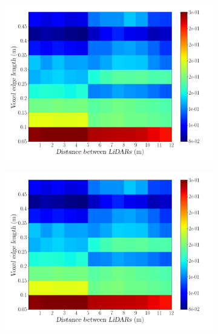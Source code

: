 \begin{figure}[!ht]
\centering
\begin{subfigure}[c]{0.45\textwidth}
	\includegraphics[width=\textwidth]{img/lidar-interference/distance/octree_interference_color_mesh.png}
\caption{}%
	\label{fig:distance:octree-interference-color-mesh}
\end{subfigure}
\qquad
\begin{subfigure}[c]{0.45\textwidth}
	\includegraphics[width=\textwidth]{img/lidar-interference/distance/octree_ground_truth_color_mesh.png}
\caption{}%

\end{subfigure}
\end{figure}
